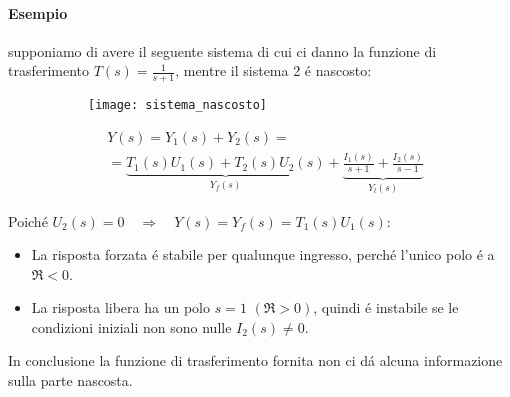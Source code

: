 \documentclass[../main.tex]{subfiles}
\begin{document}
	\paragraph{Esempio} supponiamo di avere il seguente sistema di cui ci danno la funzione di trasferimento $ T(s) = \frac{1}{s+1} $, mentre il sistema 2 \'e nascosto:\\
	\begin{figure}[H]
		\begin{subfigure}{0.4\textwidth}
			\texttt{[image: sistema\_nascosto]}
		\end{subfigure}
		\begin{subfigure}{0.5\textwidth}
			\begin{align*}
				&Y(s) = Y_1(s) + Y_2(s) =\\
				&= \underbrace{T_1(s)U_1(s) + T_2(s)U_2(s)}_{Y_f(s)} + \underbrace{\frac{I_1(s)}{s+1} + \frac{I_2(s)}{s-1}}_{Y_l(s)}
			\end{align*}
		\end{subfigure}
	\end{figure}
	Poich\'e $ U_2(s) = 0 \quad \Rightarrow \quad Y(s) = Y_f(s) = T_1(s)U_1(s)$:
	\begin{itemize}
		\item La risposta forzata \'e stabile per qualunque ingresso, perch\'e l'unico polo \'e a $ \Re < 0 $.
		\item La risposta libera ha un polo $ s = 1 $ $ (\Re > 0) $, quindi \'e instabile se le condizioni iniziali non sono nulle $ I_2(s) \neq 0 $.
	\end{itemize}
	In conclusione la funzione di trasferimento fornita non ci d\'a alcuna informazione sulla parte nascosta.
\end{document}
